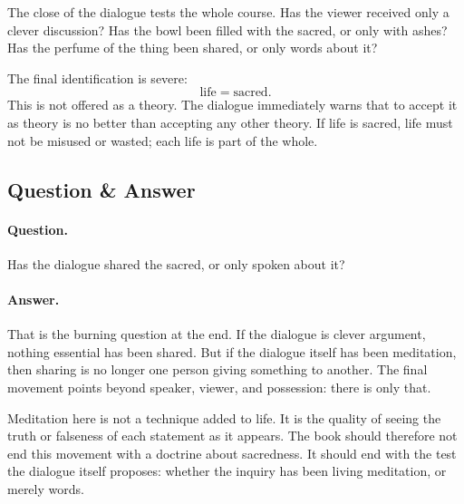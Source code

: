\documentclass[11pt,oneside]{book}
\begin{document}
The close of the dialogue tests the whole course. Has the viewer received only a clever discussion? Has the bowl been filled with the sacred, or only with ashes? Has the perfume of the thing been shared, or only words about it?

The final identification is severe:
\begin{equation}
\text{life} = \text{sacred}.
\end{equation}
This is not offered as a theory. The dialogue immediately warns that to accept it as theory is no better than accepting any other theory. If life is sacred, life must not be misused or wasted; each life is part of the whole.

\subsection{Question \& Answer}

\paragraph{Question.}
Has the dialogue shared the sacred, or only spoken about it?

\paragraph{Answer.}
That is the burning question at the end. If the dialogue is clever argument, nothing essential has been shared. But if the dialogue itself has been meditation, then sharing is no longer one person giving something to another. The final movement points beyond speaker, viewer, and possession: there is only that.

Meditation here is not a technique added to life. It is the quality of seeing the truth or falseness of each statement as it appears. The book should therefore not end this movement with a doctrine about sacredness. It should end with the test the dialogue itself proposes: whether the inquiry has been living meditation, or merely words.
\end{document}
